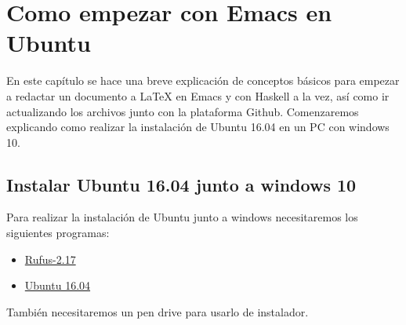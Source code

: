 \chapter{Como empezar con Emacs en Ubuntu}\label{aped.A}

En este capítulo se hace una breve explicación de conceptos básicos para empezar a redactar un documento a LaTeX en Emacs y con Haskell a la vez, así como ir actualizando los archivos junto con la plataforma Github. Comenzaremos explicando como realizar la instalación de Ubuntu 16.04 en un PC con windows 10.\\

\section{Instalar Ubuntu 16.04 junto a windows 10}

Para realizar la instalación de Ubuntu junto a windows necesitaremos los siguientes programas:\\
\begin{itemize}

\item \href{https://rufus.akeo.ie/?locale=es_ES}{Rufus-2.17}\\

\item \href{https://www.ubuntu.com/download/desktop}{Ubuntu 16.04}\\

\end{itemize}
También necesitaremos un pen drive para usarlo de instalador.\\

